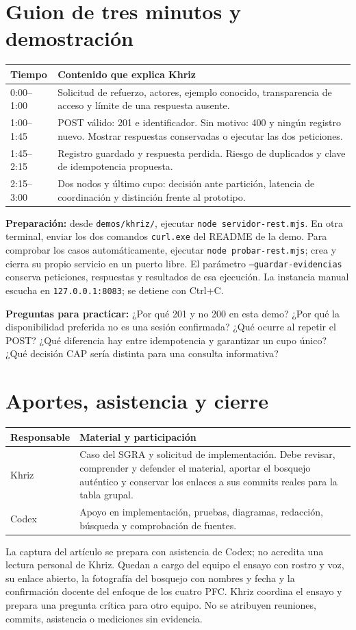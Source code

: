 \section*{Guion de tres minutos y demostración}
\begin{tabularx}{\textwidth}{@{}p{1.8cm}X@{}}
\toprule
Tiempo & Contenido que explica Khriz \\
\midrule
0:00--1:00 & Solicitud de refuerzo, actores, ejemplo conocido, transparencia de acceso y límite de una respuesta ausente. \\
1:00--1:45 & POST válido: 201 e identificador. Sin motivo: 400 y ningún registro nuevo. Mostrar respuestas conservadas o ejecutar las dos peticiones. \\
1:45--2:15 & Registro guardado y respuesta perdida. Riesgo de duplicados y clave de idempotencia propuesta. \\
2:15--3:00 & Dos nodos y último cupo: decisión ante partición, latencia de coordinación y distinción frente al prototipo. \\
\bottomrule
\end{tabularx}

\textbf{Preparación:} desde \texttt{demos/khriz/}, ejecutar \texttt{node servidor-rest.mjs}. En otra terminal, enviar los dos comandos \texttt{curl.exe} del README de la demo. Para comprobar los casos automáticamente, ejecutar \texttt{node probar-rest.mjs}; crea y cierra su propio servicio en un puerto libre. El parámetro \texttt{--guardar-evidencias} conserva peticiones, respuestas y resultados de esa ejecución. La instancia manual escucha en \texttt{127.0.0.1:8083}; se detiene con Ctrl+C.

\textbf{Preguntas para practicar:} ¿Por qué 201 y no 200 en esta demo? ¿Por qué la disponibilidad preferida no es una sesión confirmada? ¿Qué ocurre al repetir el POST? ¿Qué diferencia hay entre idempotencia y garantizar un cupo único? ¿Qué decisión CAP sería distinta para una consulta informativa?

\newpage
\section*{Aportes, asistencia y cierre}
\begin{tabularx}{\textwidth}{@{}p{2.1cm}X@{}}
\toprule
Responsable & Material y participación \\
\midrule
Khriz & Caso del SGRA y solicitud de implementación. Debe revisar, comprender y defender el material, aportar el bosquejo auténtico y conservar los enlaces a sus commits reales para la tabla grupal. \\
Codex & Apoyo en implementación, pruebas, diagramas, redacción, búsqueda y comprobación de fuentes. \\
\bottomrule
\end{tabularx}
La captura del artículo se prepara con asistencia de Codex; no acredita una lectura personal de Khriz. Quedan a cargo del equipo el ensayo con rostro y voz, su enlace abierto, la fotografía del bosquejo con nombres y fecha y la confirmación docente del enfoque de los cuatro PFC. Khriz coordina el ensayo y prepara una pregunta crítica para otro equipo. No se atribuyen reuniones, commits, asistencia o mediciones sin evidencia.


